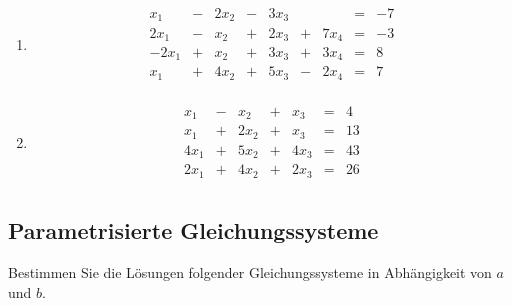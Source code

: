 \begin{enumerate}
				\item
					
					\[
						\begin{array} {ccccccccc}
							x_1 & - & 2 x_2 & - & 3 x_3 & & & = & -7 \\
							2 x_1 & - & x_2 & + & 2 x_3 & + & 7 x_4 & = & -3\\
							-2 x_1 & + & x_2 & + & 3 x_3 & + & 3 x_4 & = & 8\\
							x_1 & + & 4 x_2 & + & 5 x_3 & - & 2 x_4 & = & 7\\
						\end{array}
						\]
						
				\item
					
					\[
						\begin{array} {ccccccc}
							x_1 & - & x_2 & + & x_3 & = & 4 \\
							x_1 & + & 2 x_2 & + & x_3 & = & 13\\
							4 x_1 & + & 5 x_2 & + & 4 x_3 & = & 43\\
							2 x_1 & + & 4 x_2 & + & 2 x_3 & = & 26\\
						\end{array}
					\]
					

			\end{enumerate}
			
		\subsection{Parametrisierte Gleichungssysteme}
				
			Bestimmen Sie die L\"osungen folgender Gleichungssysteme in Abh\"angigkeit von $a$ und $b$.

